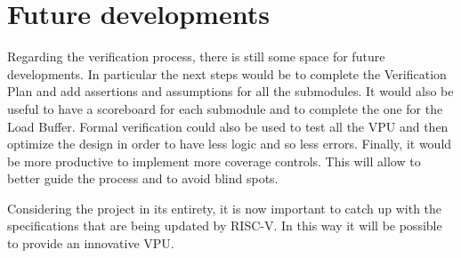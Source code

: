 \section{Future developments}
Regarding the verification process, there is still some space for future developments. In particular the next steps would be to complete the Verification Plan and add assertions and assumptions for all the submodules. 
It would also be useful to have a scoreboard for each submodule and to complete the one for the Load Buffer.
Formal verification could also be used to test all the VPU and then optimize the design in order to have less logic and so less errors.
Finally, it would be more productive to implement more coverage controls. This will allow to better guide the process and to avoid blind spots.

Considering the project in its entirety, it is now important to catch up with the specifications that are being updated by RISC-V. In this way it will be possible to provide an innovative VPU.



